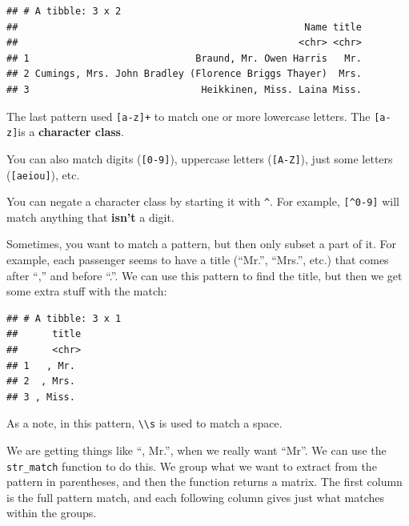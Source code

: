 \documentclass[]{book}
\makeatletter
\newenvironment{Shaded}{\begin{snugshade}}{\end{snugshade}}
\newcommand{\KeywordTok}[1]{\textcolor[rgb]{0.13,0.29,0.53}{\textbf{#1}}}
\newcommand{\DataTypeTok}[1]{\textcolor[rgb]{0.13,0.29,0.53}{#1}}
\newcommand{\DecValTok}[1]{\textcolor[rgb]{0.00,0.00,0.81}{#1}}
\newcommand{\CharTok}[1]{\textcolor[rgb]{0.31,0.60,0.02}{#1}}
\newcommand{\StringTok}[1]{\textcolor[rgb]{0.31,0.60,0.02}{#1}}
\newcommand{\OperatorTok}[1]{\textcolor[rgb]{0.81,0.36,0.00}{\textbf{#1}}}
\newcommand{\NormalTok}[1]{#1}
\newenvironment{kframe}{%
\medskip{}
\setlength{\fboxsep}{.8em}
 \def\at@end@of@kframe{}%
 \ifinner\ifhmode%
  \def\at@end@of@kframe{\end{minipage}}%
  \begin{minipage}{\columnwidth}%
 \fi\fi%
 \def\FrameCommand##1{\hskip\@totalleftmargin \hskip-\fboxsep
 \colorbox{shadecolor}{##1}\hskip-\fboxsep
     \hskip-\linewidth \hskip-\@totalleftmargin \hskip\columnwidth}%
 \MakeFramed {\advance\hsize-\width
   \@totalleftmargin\z@ \linewidth\hsize
   \@setminipage}}%
 {\par\unskip\endMakeFramed%
 \at@end@of@kframe}
\renewenvironment{Shaded}{\begin{kframe}}{\end{kframe}}
\theoremstyle{definition}
\theoremstyle{definition}
\theoremstyle{definition}
\theoremstyle{remark}
\makeatother
\begin{document}
\begin{verbatim}
## # A tibble: 3 x 2
##                                                  Name title
##                                                 <chr> <chr>
## 1                             Braund, Mr. Owen Harris   Mr.
## 2 Cumings, Mrs. John Bradley (Florence Briggs Thayer)  Mrs.
## 3                              Heikkinen, Miss. Laina Miss.
\end{verbatim}

The last pattern used \texttt{{[}a-z{]}+} to match one or more lowercase
letters. The \texttt{{[}a-z{]}}is a \textbf{character class}. \bigskip 

You can also match digits (\texttt{{[}0-9{]}}), uppercase letters
(\texttt{{[}A-Z{]}}), just some letters (\texttt{{[}aeiou{]}}), etc.
\bigskip

You can negate a character class by starting it with \texttt{\^{}}. For
example, \texttt{{[}\^{}0-9{]}} will match anything that \textbf{isn't}
a digit.

Sometimes, you want to match a pattern, but then only subset a part of
it. For example, each passenger seems to have a title (``Mr.'',
``Mrs.'', etc.) that comes after ``,'' and before ``.''. We can use this
pattern to find the title, but then we get some extra stuff with the
match:

\begin{Shaded}
\end{Shaded}

\begin{verbatim}
## # A tibble: 3 x 1
##      title
##      <chr>
## 1   , Mr. 
## 2  , Mrs. 
## 3 , Miss.
\end{verbatim}

As a note, in this pattern, \texttt{\textbackslash{}\textbackslash{}s}
is used to match a space.

We are getting things like ``, Mr.'', when we really want ``Mr''. We can
use the \texttt{str\_match} function to do this. We group what we want
to extract from the pattern in parentheses, and then the function
returns a matrix. The first column is the full pattern match, and each
following column gives just what matches within the groups.
\end{document}
